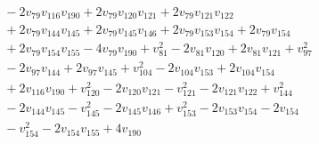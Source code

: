 \begin{align*}
&{}-2v_{79}v_{116}v_{190}+2v_{79}v_{120}v_{121}+2v_{79}v_{121}v_{122}\\
&{}+2v_{79}v_{144}v_{145}+2v_{79}v_{145}v_{146}+2v_{79}v_{153}v_{154}+2v_{79}v_{154}\\
&{}+2v_{79}v_{154}v_{155}-4v_{79}v_{190}+v_{81}^{2}-2v_{81}v_{120}+2v_{81}v_{121}+v_{97}^{2}\\
&{}-2v_{97}v_{144}+2v_{97}v_{145}+v_{104}^{2}-2v_{104}v_{153}+2v_{104}v_{154}\\
&{}+2v_{116}v_{190}+v_{120}^{2}-2v_{120}v_{121}-v_{121}^{2}-2v_{121}v_{122}+v_{144}^{2}\\
&{}-2v_{144}v_{145}-v_{145}^{2}-2v_{145}v_{146}+v_{153}^{2}-2v_{153}v_{154}-2v_{154}\\
&{}-v_{154}^{2}-2v_{154}v_{155}+4v_{190}\\
\end{align*}
\endgroup
